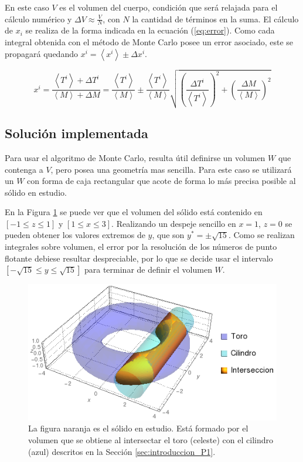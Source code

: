 \documentclass{article}
\def\mean#1{\left< #1 \right>}
\begin{document}
En este caso $V$ es el volumen del cuerpo, condición que será relajada para el cálculo numérico y $\Delta V \approx \frac{V}{N}$, con $N$ la cantidad de términos en la suma. El cálculo de $x_i$ se realiza de la forma indicada en la ecuación (\ref{eq:error}). Como cada integral obtenida con el método de Monte Carlo posee un error asociado, este se propagará quedando $x^i = \mean{x^i} \pm \Delta x^i$.

\begin{equation}
  x^i = \frac{\mean{T^i} + \Delta T^i}{\mean{M} + \Delta M} = \frac{\mean{T^i}}{\mean{M}} \pm \frac{\mean{T^i}}{\mean{M}} \sqrt{ \left( \frac{\Delta T^i}{\mean{T^i}} \right)^2 + \left( \frac{\Delta M}{\mean{M}} \right)^2 }
  \label{eq:error}
\end{equation}

\subsection{Solución implementada}

Para usar el algoritmo de Monte Carlo, resulta útil definirse un volumen $W$ que contenga a $V$, pero posea una geometría mas sencilla. Para este caso se utilizará un $W$ con forma de caja rectangular que acote de forma lo más precisa posible al sólido en estudio.

En la Figura \ref{fig:interseccion_P1} se puede ver que el volumen del sólido está contenido en $ [-1 \le z \le 1]$ y $[1 \le x \le 3]$. Realizando un despeje sencillo en $x = 1$, $z = 0$ se pueden obtener los valores extremos de $y$, que son $y^* = \pm \sqrt{15}$. Como se realizan integrales sobre volumen, el error por la resolución de los números de punto flotante debiese resultar despreciable, por lo que se decide usar el intervalo $[-\sqrt{15} \le y \le \sqrt{15} ]$ para terminar de definir el volumen $W$.

\begin{figure}[ht]
  \centering
  \includegraphics[scale = 0.5]{images/interseccion_P1.png}
  \caption{La figura naranja es el sólido en estudio. Está formado por el volumen que se obtiene al intersectar el toro (celeste) con el cilindro (azul) descritos en la Sección \ref{sec:introduccion_P1}. }
  \label{fig:interseccion_P1}
\end{figure}
\end{document}
